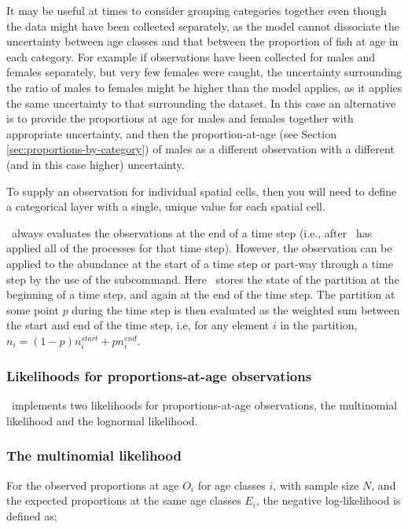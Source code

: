 It may be useful at times to consider grouping categories together even though the data might have been collected separately, as the model cannot dissociate the uncertainty between age classes and that between the proportion of fish at age in each category. For example if observations have been collected for males and females separately, but very few females were caught, the uncertainty surrounding the ratio of males to females might be higher than the model applies, as it applies the same uncertainty to that surrounding the dataset. In this case an alternative is to provide the proportions at age for males and females together with appropriate uncertainty, and then the proportion-at-age (see Section \ref{sec:proportions-by-category}) of males as a different observation with a different (and in this case higher) uncertainty.

To supply an observation for individual spatial cells, then you will need to define a categorical layer with a single, unique value for each spatial cell. 

\SPM\ always evaluates the observations at the end of a time step (i.e., after \SPM\ has applied all of the processes for that time step). However, the observation can be applied to the abundance at the start of a time step or part-way through a time step by the use of the  subcommand. Here \SPM\ stores the state of the partition at the beginning of a time step, and again at the end of the time step. The partition at some point $p$ during the time step is then evaluated as the weighted sum between the start and end of the time step, i.e, for any element $i$ in the partition, $n_i=(1-p) n_i^{start} + p n_i^{end}$.

\subsubsection{Likelihoods for proportions-at-age observations}

\SPM\ implements two likelihoods for proportions-at-age observations, the multinomial likelihood and the lognormal likelihood. 

\subsubsection*{The multinomial likelihood}

For the observed proportions at age $O_i$ for age classes $i$, with sample size $N$, and the expected proportions at the same age classes $E_i$, the negative log-likelihood is defined as; 

